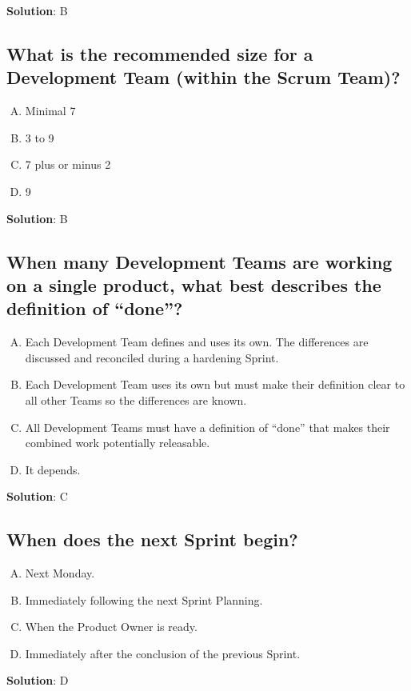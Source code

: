 \textbf{Solution}: B


\subsection{What is the recommended size for a Development Team (within the Scrum Team)?}
\begin{enumerate}[A)]
  \item Minimal 7
  \item 3 to 9
  \item 7 plus or minus 2
  \item 9
\end{enumerate}


\textbf{Solution}: B


\subsection{When many Development Teams are working on a single product, what best describes the definition of \enquote{done}?}
\begin{enumerate}[A)]
  \item Each Development Team defines and uses its own. The differences are discussed and reconciled during a hardening Sprint.
  \item Each Development Team uses its own but must make their definition clear to all other Teams so the differences are known.
  \item All Development Teams must have a definition of \enquote{done} that makes their combined work potentially releasable.
  \item It depends.
\end{enumerate}


\textbf{Solution}: C


\subsection{When does the next Sprint begin?}
\begin{enumerate}[A)]
  \item Next Monday.
  \item Immediately following the next Sprint Planning.
  \item When the Product Owner is ready.
  \item Immediately after the conclusion of the previous Sprint.
\end{enumerate}


\textbf{Solution}: D


